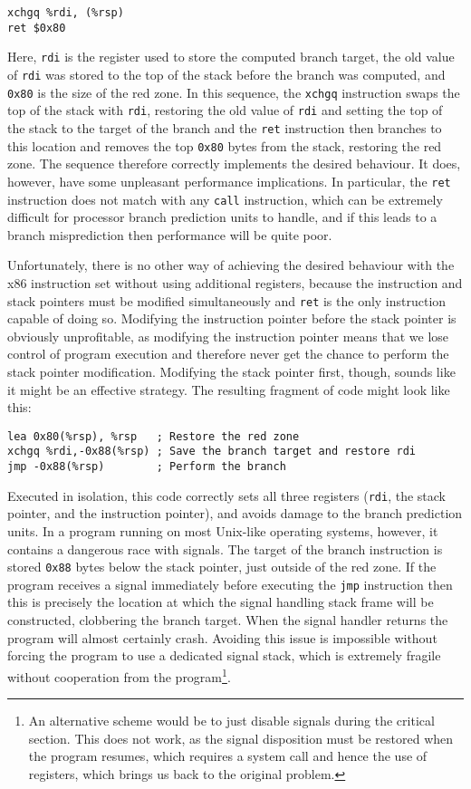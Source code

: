 \begin{verbatim}
xchgq %rdi, (%rsp)
ret $0x80
\end{verbatim}

Here, \verb|rdi| is the register used to store the computed branch
target, the old value of \verb|rdi| was stored to the top of the stack
before the branch was computed, and \verb|0x80| is the size of the red
zone.  In this sequence, the \verb|xchgq| instruction swaps the top of
the stack with \verb|rdi|, restoring the old value of \verb|rdi| and
setting the top of the stack to the target of the branch and the
\verb|ret| instruction then branches to this location and removes the
top \verb|0x80| bytes from the stack, restoring the red zone.  The
sequence therefore correctly implements the desired behaviour.  It
does, however, have some unpleasant performance implications.  In
particular, the \verb|ret| instruction does not match with any
\verb|call| instruction, which can be extremely difficult for
processor branch prediction units to handle\needCite{}, and if this
leads to a branch misprediction then performance will be quite poor.

Unfortunately, there is no other way of achieving the desired
behaviour with the x86 instruction set without using additional
registers, because the instruction and stack pointers must be modified
simultaneously and \verb|ret| is the only instruction capable of doing
so.  Modifying the instruction pointer before the stack pointer is
obviously unprofitable, as modifying the instruction pointer means
that we lose control of program execution and therefore never get the
chance to perform the stack pointer modification.  Modifying the stack
pointer first, though, sounds like it might be an effective strategy.
The resulting fragment of code might look like this:

\begin{verbatim}
lea 0x80(%rsp), %rsp   ; Restore the red zone
xchgq %rdi,-0x88(%rsp) ; Save the branch target and restore rdi
jmp -0x88(%rsp)        ; Perform the branch
\end{verbatim}

Executed in isolation, this code correctly sets all three registers
(\verb|rdi|, the stack pointer, and the instruction pointer), and
avoids damage to the branch prediction units.  In a program running on
most Unix-like operating systems, however, it contains a dangerous
race with signals.  The target of the branch instruction is stored
\verb|0x88| bytes below the stack pointer, just outside of the red
zone.  If the program receives a signal immediately before executing
the \verb|jmp| instruction then this is precisely the location at
which the signal handling stack frame will be constructed, clobbering
the branch target.  When the signal handler returns the program will
almost certainly crash.  Avoiding this issue is impossible without
forcing the program to use a dedicated signal stack, which is
extremely fragile without cooperation from the program\footnote{An
  alternative scheme would be to just disable signals during the
  critical section.  This does not work, as the signal disposition
  must be restored when the program resumes, which requires a system
  call and hence the use of registers, which brings us back to the
  original problem.}.

